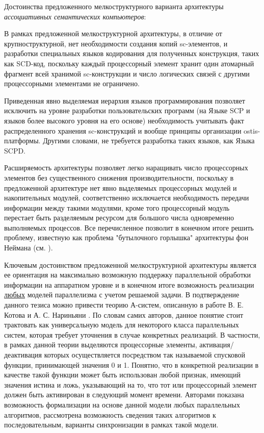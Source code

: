 Достоинства предложенного мелкоструктурного варианта архитектуры \textit{ассоциативных семантических компьютеров}:
\begin{textitemize}
	\item В рамках предложенной мелкоструктурной архитектуры, в отличие от крупноструктурной, нет необходимости создания копий sc-элементов, и разработки специальных языков кодирования для полученных конструкция, таких как SCD-код, поскольку каждый процессорный элемент хранит один атомарный фрагмент всей хранимой sc-конструкции и число логических связей с другими процессорными элементами не ограничено.
	\item Приведенная явно выделяемая иерархия языков программирования позволяет исключить на уровне разработки пользовательских программ (на Языке SCP и языков более высокого уровня на его основе) необходимость учитывать факт распределенного хранения sc-конструкций и вообще принципы организации ostis-платформы. Другими словами, не требуется разработка таких языков, как Языка SCPD.
	\item Расширяемость архитектуры позволяет легко наращивать число процессорных элементов без существенного снижения производительности, поскольку в предложенной архитектуре нет явно выделяемых процессорных модулей и накопительных модулей, соответственно исключается необходимость передачи информации между такими модулями, кроме того процессорный модуль перестает быть разделяемым ресурсом для большого числа одновременно выполняемых процессов. Все перечисленное позволит в конечном итоге решить проблему, известную как проблема "бутылочного горлышка"{} архитектуры фон Неймана (см. ).
	\item Ключевым достоинством предложенной мелкоструктурной архитектуры является ее ориентация на максимально возможную поддержку параллельной обработки информации на аппаратном уровне и в конечном итоге возможность реализации \underline{любых} моделей параллелизма с учетом решаемой задачи. В подтверждение данного тезиса можно привести теорию А-систем, описанную в работе В. Е. Котова и А. С. Нариньяни . По словам самих авторов, данное понятие стоит трактовать как универсальную модель для некоторого класса параллельных систем, которая требует уточнения в случае конкретных реализаций. В частности, в рамках данной теории выделяются процессорные элементы, активация/деактивация которых осуществляется посредством так называемой спусковой функции, принимающей значения 0 и 1. Понятно, что в конкретной реализации в качестве такой функции может быть использован любой признак, имеющий значения истина и ложь, указывающий на то, что тот или процессорный элемент должен быть активирован в следующий момент времени. Авторами показана возможность формализации на основе данной модели любых параллельных алгоритмов, рассмотрена возможность сведения таких алгоритмов к последовательным, варианты синхронизации в рамках такой модели. 
	

\end{textitemize}
